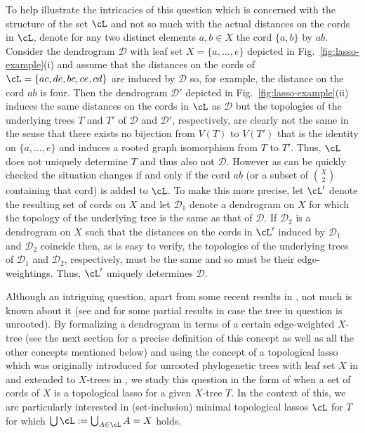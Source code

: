 To help illustrate the intricacies of this question which is concerned with
the structure of the set $\cL$ and not so much with the actual distances on
the cords in $\cL$, denote for any two distinct elements $a,b\in X$ the cord
$\{a,b\}$ by $ab$. Consider the dendrogram $\mathcal D$ with leaf set
$X=\{a,\ldots, e\}$ depicted in Fig.~\ref{fig:lasso-example}(i) and assume
that the distances on the cords of $\cL=\{ac,de,bc,ce,cd\}$ are induced by
$\mathcal D$ so, for example, the distance on the cord $ab$
is four. Then the dendrogram $\mathcal D'$ depicted in
Fig.~\ref{fig:lasso-example}(ii) induces the same distances on the cords in
$\cL$ as $\mathcal D$ but the topologies of the underlying trees $T$ and $T'$
of $\mathcal D$ and $\mathcal D'$, respectively, are clearly not the same in
the sense that there exists no bijection from $V(T)$ to $V(T')$ that is the
identity on $\{a,\ldots, e\}$ and induces a rooted graph isomorphism from $T$
to $T'$.  Thus, $\cL$ does not uniquely determine $T$ and thus also not
$\mathcal D$. However as can be quickly checked the situation changes if and
only if the cord $ab$ (or a subset of ${X\choose 2}$ containing that cord) is
added to $\cL$.  To make this more precise, let $\cL'$ denote the resulting
set of cords on $X$ and let $\mathcal D_1$ denote a dendrogram on $X$ for
which the topology of the underlying tree is the same as that of $\mathcal
D$. If $\mathcal D_2$ is a dendrogram on $X$ such that the distances on the
cords in $\cL'$ induced by $\mathcal D_1$ and $\mathcal D_2$ coincide then, as
is easy to verify, the topologies of the underlying trees of $\mathcal D_1$
and $\mathcal D_2$, respectively, must be the same and so must be their
edge-weightings. Thus, $\cL'$ uniquely determines $\mathcal D$.

Although an intriguing question, apart from some recent results in
\cite{HP13}, not much is known about it (see \cite{DHS11} and \cite{HS13} for
some partial results in case the tree in question is unrooted).  By
formalizing a dendrogram in terms of a certain edge-weighted $X$-tree (see the
next section for a precise definition of this concept as well as all the other
concepts mentioned below) and using the concept of a topological lasso which
was originally introduced for unrooted phylogenetic trees with leaf set $X$ in
\cite{DHS11} and extended to $X$-trees in \cite {HP13}, we study this question
in the form of when a set of cords of $X$ is a topological lasso for a given
$X$-tree $T$. In the context of this, we are particularly interested in
(set-inclusion) minimal topological lassos $\cL$ for $T$ for which $ \bigcup
\cL:=\bigcup_{A\in\cL} A=X$ holds.

